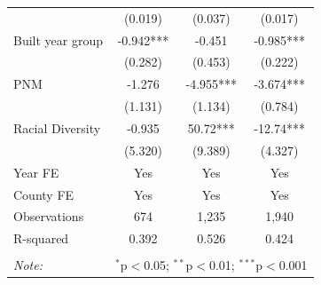 \documentclass[12pt,twoside,letterpaper]{article}
\begin{document}
\begin{table}[H]
{\begin{tabular}{lccc}
 & (0.019) & (0.037) & (0.017) \\
Built year group & -0.942*** & -0.451 & -0.985*** \\
 & (0.282) & (0.453) & (0.222) \\
PNM & -1.276 & -4.955*** & -3.674*** \\
 & (1.131) & (1.134) & (0.784) \\
Racial Diversity & -0.935 & 50.72*** & -12.74*** \\
 & (5.320) & (9.389) & (4.327) \\ \cline{1-4}
Year FE & Yes & Yes & Yes \\
County FE & Yes & Yes & Yes \\
Observations & 674 & 1,235 & 1,940 \\
R-squared & 0.392 & 0.526 & 0.424 \\ 
\hline
\hline \\[-1.8ex]
\textit{Note:} & \multicolumn{3}{r}{$^{*}$p$<$0.05; $^{**}$p$<$0.01; $^{***}$p$<$0.001} \\
\end{tabular}}
\end{table}
\end{document}
